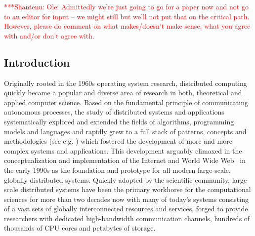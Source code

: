 \documentclass[a4paper,10pt]{article}
\newcommand{\jhanote}[1]{  {\textcolor{red}     { ***Shantenu: #1 }}}
\newcommand{\jhanote}[1]{}
\begin{document}
\jhanote{Ole: Admittedly we're just going to go for a paper now and
  not go to an editor for input -- we might still but we'll not put
  that on the critical path. However, please do comment on what
  makes/doesn't make sense, what you agree with and/or don't agree
  with.}


\subsection*{Introduction}

 Originally rooted in the 1960s operating system research, distributed
 computing quickly became a popular and diverse area of research in
 both, theoretical and applied computer science. Based on the
 fundamental principle of communicating autonomous processes, the
 study of distributed systems and applications systematically explored
 and extended the fields of algorithms, programming models and
 languages and rapidly grew to a full stack of patterns, concepts and
 methodologies (see e.g. \cite{519301}) which fostered the development
 of more and more complex systems and applications. This development
 arguably climaxed in the conceptualization and implementation of the
 Internet and World Wide Web~\cite{Berners-lee92world-wideweb} in the
 early 1990s as the foundation and prototype for all modern
 large-scale, globally-distributed systems. Quickly adopted by the
 scientific community, large-scale distributed systems have been the
 primary workhorse for the computational sciences for more than two
 decades now with many of today's systems consisting of a vast sets of
 globally interconnected resources and services, forged to provide
 researchers with dedicated high-bandwidth communication channels,
 hundreds of thousands of CPU cores and petabytes of storage.
 
\end{document}
